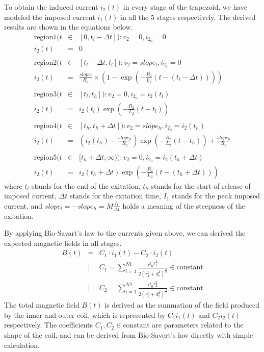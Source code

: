 To obtain the induced current $i_2(t)$ in every stage of the trapezoid,
we have modeled the imposed current $i_1(t)$ in all the 5 stages respectively.
The derived results are shown in the equations below.
\begin{eqnarray}
  \mathrm{region1}(t&\in&[0, t_l-\Delta t]): v_2 = 0, i_{2_0} = 0\nonumber\\
  i_2(t) &=& 0\\
  \nonumber\\
  \mathrm{region2}(t&\in&[t_l-\Delta t, t_l]): v_2 = slope_l, i_{2_0} = 0\nonumber\\
  i_2(t) &=& \frac{slope_l}{R_2}\times\left( 1 - \exp(-\frac{R_2}{L_2}(t-(t_l-\Delta t))) \right)\\
  \nonumber\\
  \mathrm{region3}(t&\in&[t_l, t_h]): v_2 = 0, i_{2_0} = i_2(t_l)\nonumber\\
  i_2(t) &=& i_2(t_l)\exp(-\frac{R_2}{L_2}(t-t_l))\\
  \nonumber\\
  \mathrm{region4}(t&\in&[t_h, t_h+\Delta t]): v_2 = slope_h, i_{2_0} = i_2(t_h)\nonumber\\
  i_2(t) &=& \left(i_2(t_h) - \frac{slope_h}{R_2}\right)\exp(-\frac{R_2}{L_2}(t-t_h)) + \frac{slope_h}{R_2}\\
  \nonumber\\
  \mathrm{region5}(t&\in&[t_h+\Delta t, \infty)): v_2 = 0, i_{2_0} = i_2(t_h+\Delta t)\nonumber\\
  i_2(t) &=& i_2(t_h+\Delta t)\exp(-\frac{R_2}{L_2}(t-(t_h+\Delta t)))
\end{eqnarray}
where $t_l$ stands for the end of the exitation, $t_h$ stands for the start of release of imposed current,
$\Delta t$ stands for the exitation time, $I_1$ stands for the peak imposed current,
and $slope_l = -slope_h = M\frac{I_1}{\Delta t}$ holds a meaning of the steepness of the exitation.

By applying Bio-Savart's law to the currents given above, we can derived the expected magnetic fields in all stages.
\begin{eqnarray}
  B(t) &=& C_1\cdot i_1(t) - C_2\cdot i_2(t)\\
  &|& C_1 = \sum_{i=1}^{N1} \frac{\mu_0r_1^2}{2\left(r_1^2 + d_i^2\right)^{\frac{3}{2}}} \in \mathrm{constant}\nonumber\\
  &|& C_2 = \sum_{i=1}^{N2} \frac{\mu_0r_2^2}{2\left(r_2^2 + d_i^2\right)^{\frac{3}{2}}} \in \mathrm{constant}\nonumber
\end{eqnarray}
The total magnetic field $B(t)$ is derived as the summation of the field produced by the inner and outer coil,
which is represented by $C_1i_1(t)$ and $C_2i_2(t)$ respectively.
The coefficients $C_1, C_2 \in \mathrm{constant}$ are parameters related to the shape of the coil,
and can be derived from Bio-Savert's law directly with simple calculation.

